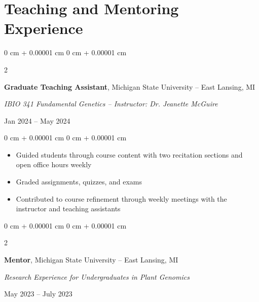 \documentclass[10pt, letterpaper]{article}
\newenvironment{highlights}{
    \begin{itemize}[
        topsep=0.10 cm,
        parsep=0.10 cm,
        partopsep=0pt,
        itemsep=0pt,
        leftmargin=0 cm + 10pt
    ]
}{
    \end{itemize}
} %
\newenvironment{onecolentry}{
    \begin{adjustwidth}{
        0 cm + 0.00001 cm
    }{
        0 cm + 0.00001 cm
    }
}{
    \end{adjustwidth}
} %
\newenvironment{twocolentry}[2][]{
    \onecolentry
    \def\secondColumn{#2}
    \setcolumnwidth{\fill, 4.5 cm}
    \begin{paracol}{2}
}{
    \switchcolumn \raggedleft \secondColumn
    \end{paracol}
    \endonecolentry
} %
\begin{document}
    \section{Teaching and Mentoring Experience}




        \begin{samepage} 
            \begin{twocolentry}{
                Jan 2024 – May 2024
                }
                \textbf{Graduate Teaching Assistant}, Michigan State University -- East Lansing, MI
                
                \vspace{0.05 cm}

                \textit{IBIO 341 Fundamental Genetics -- Instructor: Dr. Jeanette McGuire}
            \end{twocolentry}
        \end{samepage}  

        \vspace{0.10 cm}
        
        \begin{onecolentry}
            \begin{highlights}
                \item Guided students through course content with two recitation sections and open office hours weekly            
                \item Graded assignments, quizzes, and exams
                \item Contributed to course refinement through weekly meetings with the instructor and teaching assistants
            \end{highlights}
        \end{onecolentry}

        
        \vspace{0.2 cm}


        \begin{samepage} 
            \begin{twocolentry}{
                May 2023 – July 2023
                }
                \textbf{Mentor}, Michigan State University -- East Lansing, MI
                
                \vspace{0.05 cm}

                \textit{Research Experience for Undergraduates in Plant Genomics}
            \end{twocolentry}
        \end{samepage}          
\end{document}
